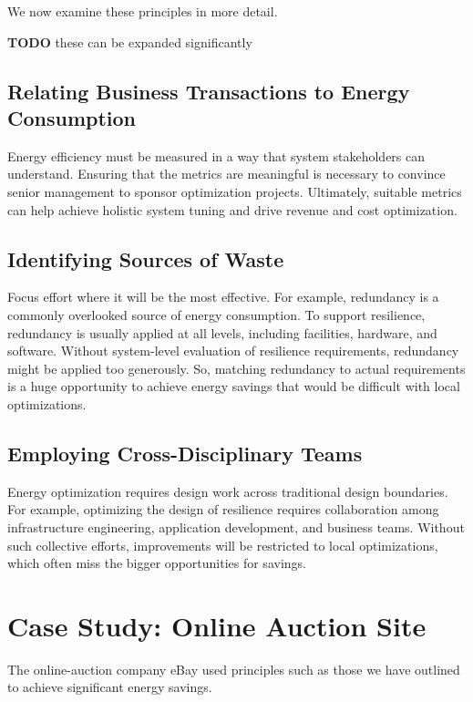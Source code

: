 We now examine these principles in more detail.

\textbf{TODO} these can be expanded significantly

\subsection{Relating Business Transactions to Energy Consumption}

Energy efficiency must be measured in a way that system stakeholders can understand. Ensuring that the metrics are meaningful is necessary to convince senior management to sponsor optimization projects. Ultimately, suitable metrics can help achieve holistic system tuning and drive revenue and cost optimization.

\subsection{Identifying Sources of Waste}

Focus effort where it will be the most effective. For example, redundancy is a commonly overlooked source of energy consumption. To support resilience, redundancy is usually applied at all levels, including facilities, hardware, and software. Without system-level evaluation of resilience requirements, redundancy might be applied too generously. So, matching redundancy to actual requirements is a huge opportunity to achieve energy savings that would be difficult with local optimizations.

\subsection{Employing Cross-Disciplinary Teams}

Energy optimization requires design work across traditional design boundaries. For example, optimizing the design of resilience requires collaboration among infrastructure engineering, application development, and business teams. Without such collective efforts, improvements will be restricted to local optimizations, which often miss the bigger opportunities for savings.

\section{Case Study: Online Auction Site}

The online-auction company eBay used principles such as those we have outlined to achieve significant energy savings.

